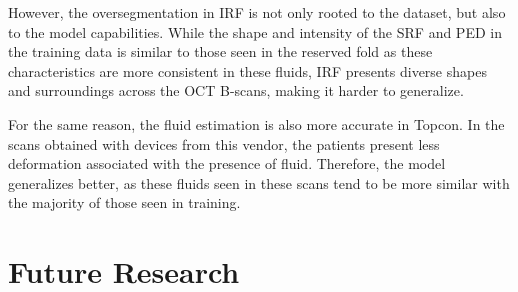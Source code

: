 \par
However, the oversegmentation in IRF is not only rooted to the dataset, but also to the model capabilities. While the shape and intensity of the SRF and PED in the training data is similar to those seen in the reserved fold as these characteristics are more consistent in these fluids, IRF presents diverse shapes and surroundings across the OCT B-scans, making it harder to generalize.
\par
For the same reason, the fluid estimation is also more accurate in Topcon. In the scans obtained with devices from this vendor, the patients present less deformation associated with the presence of fluid. Therefore, the model generalizes better, as these fluids seen in these scans tend to be more similar with the majority of those seen in training.

\section{Future Research}

